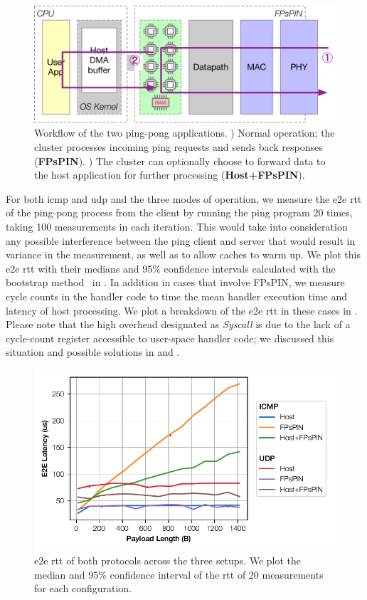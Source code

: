 \begin{figure}
    \centering
    \includegraphics[width=.8\textwidth]{figures/demo-apps.pdf}
    \caption[Workflow of the ping-pong demo]{Workflow of the two ping-pong applications.  ) Normal operation; the cluster processes incoming ping requests and sends back responses (\textbf{FPsPIN}).  ) The cluster can optionally choose to forward data to the host application for further processing (\textbf{Host+FPsPIN}).} \label{fig:demo-pingpong}
\end{figure}

For both \ac{icmp} and \ac{udp} and the three modes of operation, we measure the \ac{e2e} \ac{rtt} of the ping-pong process from the client by running the ping program 20 times, taking 100 measurements in each iteration.  This would take into consideration any possible interference between the ping client and server that would result in variance in the measurement, as well as to allow caches to warm up.  We plot this \ac{e2e} \ac{rtt} with their medians and 95\% confidence intervals calculated with the bootstrap method~\cite{diciccio_bootstrap_1996} in .  In addition in cases that involve FPsPIN, we measure cycle counts in the handler code to time the mean handler execution time and latency of host processing.  We plot a breakdown of the \ac{e2e} \ac{rtt} in these cases in .  Please note that the high overhead designated as \emph{Syscall} is due to the lack of a cycle-count register accessible to user-space handler code; we discussed this situation and possible solutions in  and .

\begin{figure}[tp]
    \centering
    \includegraphics{figures/pingpong-lat.pdf}
    \caption{\ac{e2e} \ac{rtt} of both protocols across the three setups.  We plot the median and 95\% confidence interval of the \ac{rtt} of 20 measurements for each configuration.} \label{fig:pingpong-lat}
\end{figure}

